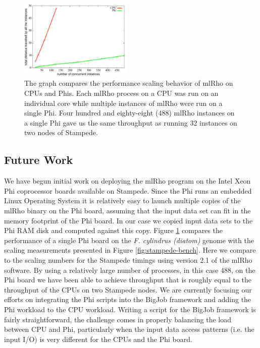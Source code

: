 \documentclass{sig-alternate}
\begin{document}
\begin{figure} %
\centering
\includegraphics[width=0.48\textwidth]{figures/mic-scaling.pdf}
\caption{The graph compares the performance scaling behavior of mlRho on CPUs and Phis. Each mlRho process on a CPU was run on an individual core while multiple instances of mlRho were run on a single Phi. Four hundred and eighty-eight (488) mlRho instances on a single Phi gave us the same throughput as running 32 instances on two nodes of Stampede.  }
\label{fig:mic-scaling}
\end{figure}

\subsection{Future Work}
We have begun initial work on deploying the mlRho program on the Intel Xeon Phi coprocessor boards
available on Stampede. Since the Phi runs an embedded Linux Operating System \cite{xeon_phi}
it is relatively easy to launch multiple copies of the mlRho binary on the Phi board, assuming
that the input data set can fit in the memory footprint of the Phi board. In our case we copied input data
sets to the Phi RAM disk and computed against this copy. Figure \ref{fig:mic-scaling} compares the performance
of a single Phi board on the {\it F. cylindrus (diatom)} genome with the scaling measurements presented in Figure
\ref{fig:stampede-bench}. Here we compare to the scaling numbers for the Stampede timings using version 2.1 of
the mlRho software. By using a relatively large number of processes, in this case 488, on the Phi board
we have been able to achieve throughput that is roughly equal to the throughput of the CPUs on two Stampede
nodes. We are currently focusing our efforts on integrating the Phi scripts into the BigJob framework and
adding the Phi workload to the CPU workload. Writing a script for the BigJob framework is fairly
straightforward, the challenge comes in properly balancing the load between CPU and Phi, particularly when the
input data access patterns (i.e. the input I/O) is very different for the CPUs and the Phi board.
\end{document}
